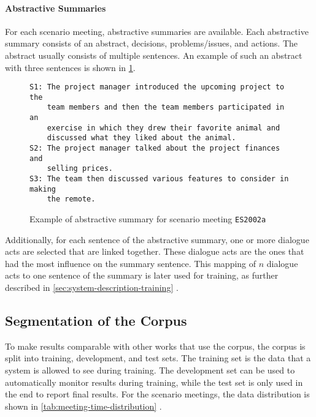 \paragraph{Abstractive Summaries}

For each scenario meeting, abstractive summaries are available.
Each abstractive summary consists of an abstract, decisions, problems/issues, and actions.
The abstract usually consists of multiple sentences.
An example of such an abstract with three sentences is shown in \cref{fig:abstractive-summary-example}.

\begin{figure}[h]
\begin{lstlisting}[numbers=none]
S1: The project manager introduced the upcoming project to the 
    team members and then the team members participated in an
    exercise in which they drew their favorite animal and
    discussed what they liked about the animal.
S2: The project manager talked about the project finances and
    selling prices.
S3: The team then discussed various features to consider in making
    the remote.
\end{lstlisting}
\caption{Example of abstractive summary for scenario meeting \texttt{ES2002a}}
\label{fig:abstractive-summary-example}
\end{figure}

Additionally, for each sentence of the abstractive summary, one or more dialogue acts are selected that are linked together.
These dialogue acts are the ones that had the most influence on the summary sentence.
This mapping of $n$ dialogue acts to one sentence of the summary is later used for training, as further described in \cref{sec:system-description-training} \cite{amiWebsite}.

\subsection{Segmentation of the Corpus}\label{ssec:ami-segmentation-of-the-corpus}

To make results comparable with other works that use the corpus, the corpus is split into training, development, and test sets.
The training set is the data that a system is allowed to see during training.
The development set can be used to automatically monitor results during training, while the test set is only used in the end to report final results.
For the scenario meetings, the data distribution is shown in \cref{tab:meeting-time-distribution} \cite{amiWebsite}.

